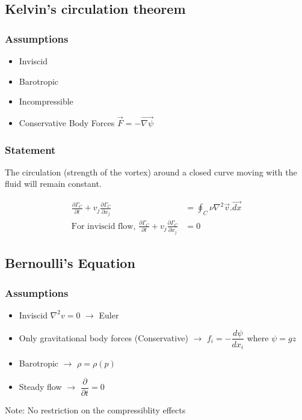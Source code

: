 \documentclass[11pt, letterpaper, notitlepage]{article}
\begin{document}
\subsection{Kelvin's circulation theorem}
\subsubsection{Assumptions}
\begin{itemize}
\item Inviscid
\item Barotropic
\item Incompressible
\item Conservative Body Forces $\vec{F} = -\vec{\nabla{\psi}}$
\end{itemize}

\subsubsection{Statement}
The circulation (strength of the vortex) around a closed curve moving with the fluid will remain constant.

\begin{align*}
\frac{\partial \Gamma_C}{\partial t} + v_j \frac{\partial \Gamma_C}{\partial x_j} &= \oint_{C}^{} \nu \nabla^2\vec{v}.\vec{dx} \\
\text{For inviscid flow, } \frac{\partial \Gamma_C}{\partial t} + v_j \frac{\partial \Gamma_C}{\partial x_j} &= 0
\end{align*}

\subsection{Bernoulli's Equation}
\subsubsection{Assumptions}
\begin{itemize}
\item Inviscid $\nabla^2 v = 0$ $\rightarrow$ Euler
\item Only gravitational body forces (Conservative) $\rightarrow$ $f_i = -\dfrac{d \psi}{dx_i}$ where $\psi = g z$
\item Barotropic $\rightarrow$ $\rho = \rho(p)$
\item Steady flow $\rightarrow$ $\dfrac{\partial}{\partial t} = 0$ 
\end{itemize}
Note: No restriction on the compressiblity effects
\end{document}
